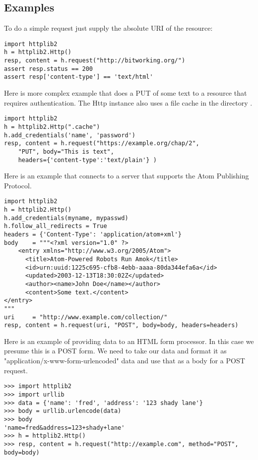 \subsection{Examples \label{httplib2-example}}

To do a simple  request just supply the absolute URI
of the resource:

\begin{verbatim}
import httplib2
h = httplib2.Http()
resp, content = h.request("http://bitworking.org/")
assert resp.status == 200
assert resp['content-type'] == 'text/html'
\end{verbatim}

Here is more complex example that does a PUT 
of some text to a resource that requires authentication.
The Http instance also uses a file cache
in the directory . 

\begin{verbatim}
import httplib2
h = httplib2.Http(".cache")
h.add_credentials('name', 'password')
resp, content = h.request("https://example.org/chap/2", 
    "PUT", body="This is text", 
    headers={'content-type':'text/plain'} )
\end{verbatim}

Here is an example that connects to a server that 
supports the Atom Publishing Protocol.

\begin{verbatim}
import httplib2
h = httplib2.Http()
h.add_credentials(myname, mypasswd)
h.follow_all_redirects = True
headers = {'Content-Type': 'application/atom+xml'}
body    = """<?xml version="1.0" ?>
    <entry xmlns="http://www.w3.org/2005/Atom">
      <title>Atom-Powered Robots Run Amok</title>
      <id>urn:uuid:1225c695-cfb8-4ebb-aaaa-80da344efa6a</id>
      <updated>2003-12-13T18:30:02Z</updated>
      <author><name>John Doe</name></author>
      <content>Some text.</content>
</entry>
"""
uri     = "http://www.example.com/collection/"
resp, content = h.request(uri, "POST", body=body, headers=headers)
\end{verbatim}

Here is an example of providing data to an HTML form processor.
In this case we presume this is a POST form. We need to take our 
data and format it as "application/x-www-form-urlencoded" data and use that as a 
body for a POST request.

\begin{verbatim}
>>> import httplib2
>>> import urllib
>>> data = {'name': 'fred', 'address': '123 shady lane'}
>>> body = urllib.urlencode(data)
>>> body
'name=fred&address=123+shady+lane'
>>> h = httplib2.Http()
>>> resp, content = h.request("http://example.com", method="POST", body=body)
\end{verbatim}
